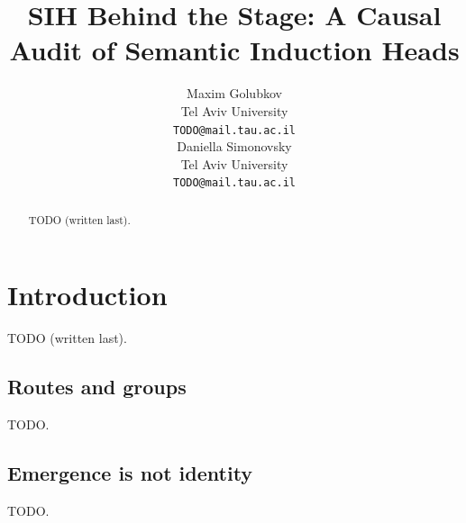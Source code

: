 \documentclass[11pt]{article}
\title{SIH Behind the Stage: A Causal Audit of Semantic Induction Heads}
\author{Maxim Golubkov \\
  Tel Aviv University \\
  \texttt{TODO@mail.tau.ac.il} \\\And
  Daniella Simonovsky \\
  Tel Aviv University \\
  \texttt{TODO@mail.tau.ac.il} \\}
\begin{document}
\maketitle

\begin{abstract}
TODO (written last).
\end{abstract}

\section{Introduction}
\label{sec:intro}
TODO (written last).






% 

\subsection{Routes and groups}\label{sec:results-routes} TODO.
\subsection{Emergence is not identity}\label{sec:results-dev} TODO.








\appendix









\end{document}
